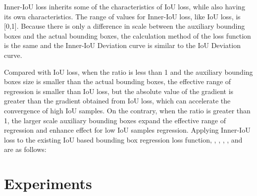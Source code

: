 \documentclass[lettersize,journal]{IEEEtran}
\begin{document}
	
	
	
	
	
	
	
	\par Inner-IoU loss inherits some of the characteristics of IoU loss, while also having its own characteristics. The range of values for Inner-IoU loss, like IoU loss, is [0,1]. Because there is only a difference in scale between the auxiliary bounding boxes and the actual bounding boxes, the calculation method of the loss function is the same and the Inner-IoU Deviation curve is similar to the IoU Deviation curve.
	\par Compared with IoU loss, when the ratio is less than 1 and the auxiliary bounding boxes size is smaller than the actual bounding boxes, the effective range of regression is smaller than IoU loss, but the absolute value of the gradient is greater than the gradient obtained from IoU loss, which can accelerate the convergence of high IoU samples. On the contrary, when the ratio is greater than 1, the larger scale auxiliary bounding boxes expand the effective range of regression and enhance effect for low IoU samples regression. Applying Inner-IoU loss to the existing IoU based bounding box regression loss function, , , , ,  and  are as follows:
	
	
	
	
	
	
	\section{Experiments}
\end{document}
